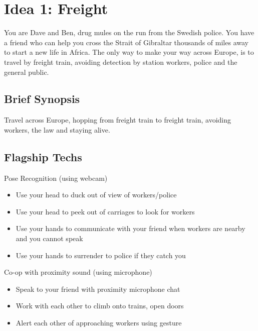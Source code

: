 \documentclass[a4paper]{article} %
\begin{document}
\normalsize\sloppy
\fi
\section*{Idea 1: Freight\hspace{\fill}\normalsize{}}
You are Dave and Ben, drug mules on the run from the Swedish police. You have a friend who can help you cross the Strait of Gibraltar thousands of miles away to start a new life in Africa. The only way to make your way across Europe, is to travel by freight train, avoiding detection by station workers, police and the general public.
\subsection*{Brief Synopsis}
Travel across Europe, hopping from freight train to freight train, avoiding workers, the law and staying alive.
\subsection*{Flagship Techs}
\begin{multicols}{2}
    Pose Recognition (using webcam)
    \begin{itemize}
        \item Use your head to duck out of view of workers/police
        \item Use your head to peek out of carriages to look for workers
        \item Use your hands to communicate with your friend when workers are nearby and you cannot speak
        \item Use your hands to surrender to police if they catch you
    \end{itemize}\columnbreak
    Co-op with proximity sound (using microphone)
    \begin{itemize}
        \item Speak to your friend with proximity microphone chat
        \item Work with each other to climb onto trains, open doors
        \item Alert each other of approaching workers using gesture\vspace{\fill}
    \end{itemize}
\end{multicols}
\end{document}
